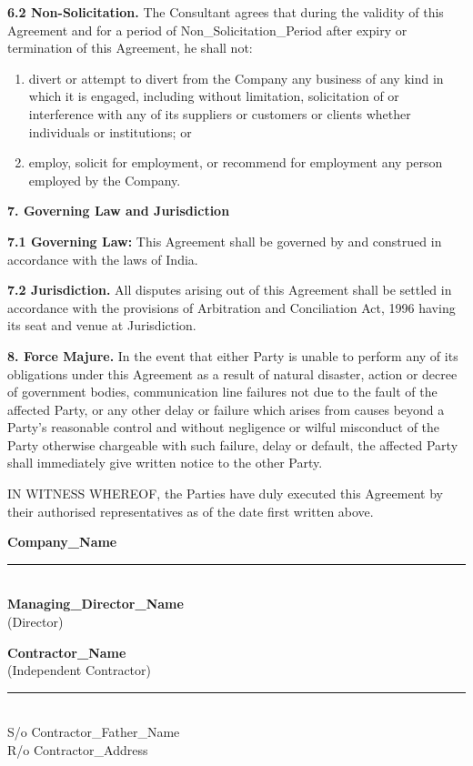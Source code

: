 \documentclass[12pt]{article}
\begin{document}
\vspace{0.5em}
\noindent
\textbf{6.2 Non-Solicitation.} The Consultant agrees that during the validity of this Agreement and for a period of {{Non_Solicitation_Period}} after expiry or termination of this Agreement, he shall not:
\begin{enumerate}
    \item[(i)] divert or attempt to divert from the Company any business of any kind in which it is engaged, including without limitation, solicitation of or interference with any of its suppliers or customers or clients whether individuals or institutions; or
    \item[(ii)] employ, solicit for employment, or recommend for employment any person employed by the Company.
\end{enumerate}

\vspace{1em}
\noindent
\textbf{7. Governing Law and Jurisdiction}

\vspace{0.5em}
\noindent
\textbf{7.1 Governing Law:} This Agreement shall be governed by and construed in accordance with the laws of India.

\vspace{0.5em}
\noindent
\textbf{7.2 Jurisdiction.} All disputes arising out of this Agreement shall be settled in accordance with the provisions of Arbitration and Conciliation Act, 1996 having its seat and venue at {{Jurisdiction}}.

\vspace{1em}
\noindent
\textbf{8. Force Majure.} In the event that either Party is unable to perform any of its obligations under this Agreement as a result of natural disaster, action or decree of government bodies, communication line failures not due to the fault of the affected Party, or any other delay or failure which arises from causes beyond a Party's reasonable control and without negligence or wilful misconduct of the Party otherwise chargeable with such failure, delay or default, the affected Party shall immediately give written notice to the other Party.

\vspace{2em}
\noindent
IN WITNESS WHEREOF, the Parties have duly executed this Agreement by their authorised representatives as of the date first written above.

\vspace{3em}
\noindent
\begin{minipage}[t]{0.45\textwidth}
    \textbf{{{Company_Name}}}\\[3em]
    \rule{4cm}{0.4pt}\\[0.5em]
    \textbf{{{Managing_Director_Name}}}\\
    (Director)
\end{minipage}
\hfill
\begin{minipage}[t]{0.45\textwidth}
    \textbf{{{Contractor_Name}}}\\
    (Independent Contractor)\\[3em]
    \rule{4cm}{0.4pt}\\[0.5em]
    S/o {{Contractor_Father_Name}}\\
    R/o {{Contractor_Address}}
\end{minipage}
\end{document}
